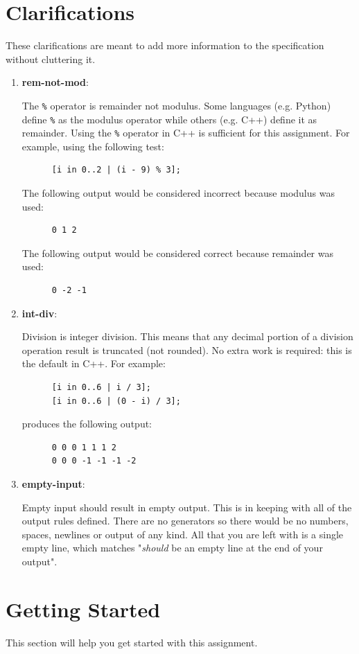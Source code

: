 \documentclass{article}
\newcommand{\code}[1]{\texttt{\textmd{#1}}}
\newcommand{\clarificationdest}[1]{\hypertarget{#1}{\textbf{#1}:}}
\begin{document}
\section{Clarifications}
These clarifications are meant to add more information to the specification without cluttering it.
\begin{enumerate}
  \item
    \clarificationdest{rem-not-mod}
    The \code{\%} operator is remainder not modulus. Some languages (e.g. Python) define \code{\%}
    as the modulus operator while others (e.g. C++) define it as remainder. Using the \code{\%}
    operator in C++ is sufficient for this assignment. For example, using the following test:
    \begin{lstlisting}
      [i in 0..2 | (i - 9) % 3];
    \end{lstlisting}
    The following output would be considered incorrect because modulus was used:
    \begin{lstlisting}
      0 1 2
    \end{lstlisting}
    The following output would be considered correct because remainder was used:
    \begin{lstlisting}
      0 -2 -1
    \end{lstlisting}
  \item
    \clarificationdest{int-div}
    Division is integer division. This means that any decimal portion of a division operation
    result is truncated (not rounded). No extra work is required: this is the default in C++. For
    example:
    \begin{lstlisting}
      [i in 0..6 | i / 3];
      [i in 0..6 | (0 - i) / 3];
    \end{lstlisting}
    produces the following output:
    \begin{lstlisting}
      0 0 0 1 1 1 2
      0 0 0 -1 -1 -1 -2
    \end{lstlisting}
  \item
    \clarificationdest{empty-input}
    Empty input should result in empty output. This is in keeping with all of the output rules
    defined. There are no generators so there would be no numbers, spaces, newlines or output of
    any kind. All that you are left with is a single empty line, which matches "\textit{should} be
    an empty line at the end of your output".

\end{enumerate}

\section{Getting Started}
This section will help you get started with this assignment.
\end{document}
